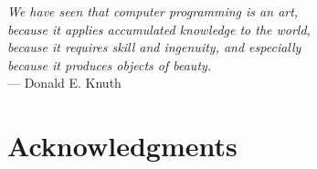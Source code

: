 
\begin{flushright}{\slshape    
    We have seen that computer programming is an art, \\ 
    because it applies accumulated knowledge to the world, \\ 
    because it requires skill and ingenuity, and especially \\
    because it produces objects of beauty.} \\ \medskip
    --- Donald E. Knuth \cite{knuth:1974}
\end{flushright}

\bigskip

\begingroup
	\let\clearpage\relax
	\let\cleardoublepage\relax
	\let\cleardoublepage\relax
	\chapter*{Acknowledgments}




\endgroup

